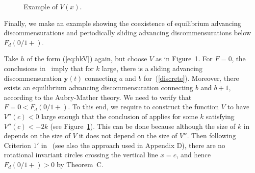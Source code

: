 \documentclass[12pt]{article}
\newcommand{\refer}[1]{~(\ref{#1})}
\newcommand{\ybf}{{\mathbf{y}}}
\begin{document}
\begin{figure}[htbp] %
   \centering

   \caption{Example of $V(x)$.}
   \label{fig:appB2}
\end{figure}


{Finally, we make an example showing the coexistence of equilibrium advancing discommensurations and periodically sliding advancing discommensurations below $F_d(0/1+)$.}

Take $h$ of the form (\ref{eq:hkV}) again, but choose
$V$  as in Figure~\ref{fig:appB2}. For $F=0$, the conclusions in~\cite{BCC} imply that for $k$ large, there is a sliding advancing discommensuration $\ybf(t)$ connecting $a$ and $b$ for\refer{discrete}. Moreover, there exists an equilibrium advancing discommensuration connecting $b$ and $b+1$, according to the Aubry-Mather theory. We need to verify that $F=0<F_d(0/1+)$. To this end, we require to construct the function $V$ to have $V''(c)<0$ large enough that the conclusion of \cite{BCC} applies for some $k$ satisfying $V''(c)<-2k$ (see Figure~\ref{fig:appB2}).   This can be done because although the size of $k$ in \cite{BCC} depends on the size of $V$ it does not depend on the size of $V''$.
Then following Criterion $1' $ in~\cite{MacP} (see also the approach used  in Appendix D), there are no rotational invariant circles crossing the vertical line $x=c$, {and hence $F_d(0/1+)>0$ by Theorem~C.}
\end{document}
